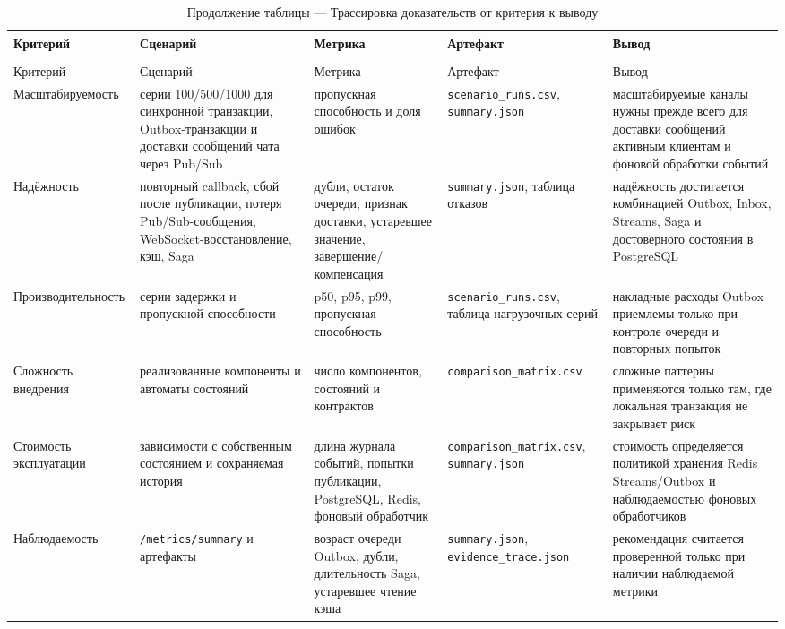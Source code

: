 \documentclass[a4paper,14pt]{extarticle}
\newcommand{\tablefont}{\scriptsize}
\renewcommand{\toprule}{\hline}
\renewcommand{\midrule}{\hline}
\renewcommand{\bottomrule}{\hline}
\numberwithin{figure}{section}
\numberwithin{table}{section}
\begin{document}
\begingroup
\tablefont
\setlength{\tabcolsep}{1.5pt}
\renewcommand{\arraystretch}{1.12}
\begin{longtable}{|L{2.6cm}|L{3.0cm}|L{2.9cm}|L{3.8cm}|L{2.9cm}|}
\caption{Трассировка доказательств от критерия к выводу}
\label{tab:evidence-main} \\
\toprule
Критерий & Сценарий & Метрика & Артефакт & Вывод \\
\midrule
\endfirsthead
\caption*{Продолжение таблицы \thetable{} --- Трассировка доказательств от критерия к выводу} \\
\toprule
Критерий & Сценарий & Метрика & Артефакт & Вывод \\
\midrule
\endhead
\bottomrule
\endfoot
Масштабируемость & серии 100/500/1000 для синхронной транзакции, Outbox-транзакции и доставки сообщений чата через Pub/Sub & пропускная способность и доля ошибок & \texttt{scenario\_runs.csv}, \texttt{summary.json} & масштабируемые каналы нужны прежде всего для доставки сообщений активным клиентам и фоновой обработки событий \\
\hline
Надёжность & повторный callback, сбой после публикации, потеря Pub/Sub-сообщения, WebSocket-восстановление, кэш, Saga & дубли, остаток очереди, признак доставки, устаревшее значение, завершение/компенсация & \texttt{summary.json}, таблица отказов & надёжность достигается комбинацией Outbox, Inbox, Streams, Saga и достоверного состояния в PostgreSQL \\
\hline
Производительность & серии задержки и пропускной способности & p50, p95, p99, пропускная способность & \texttt{scenario\_runs.csv}, таблица нагрузочных серий & накладные расходы Outbox приемлемы только при контроле очереди и повторных попыток \\
\hline
Сложность внедрения & реализованные компоненты и автоматы состояний & число компонентов, состояний и контрактов & \texttt{comparison\_matrix.csv} & сложные паттерны применяются только там, где локальная транзакция не закрывает риск \\
\hline
Стоимость эксплуатации & зависимости с собственным состоянием и сохраняемая история & длина журнала событий, попытки публикации, PostgreSQL, Redis, фоновый обработчик & \texttt{comparison\_matrix.csv}, \texttt{summary.json} & стоимость определяется политикой хранения Redis Streams/Outbox и наблюдаемостью фоновых обработчиков \\
\hline
Наблюдаемость & \texttt{/metrics/summary} и артефакты & возраст очереди Outbox, дубли, длительность Saga, устаревшее чтение кэша & \texttt{summary.json}, \texttt{evidence\_trace.json} & рекомендация считается проверенной только при наличии наблюдаемой метрики \\
\end{longtable}
\endgroup
\end{document}
